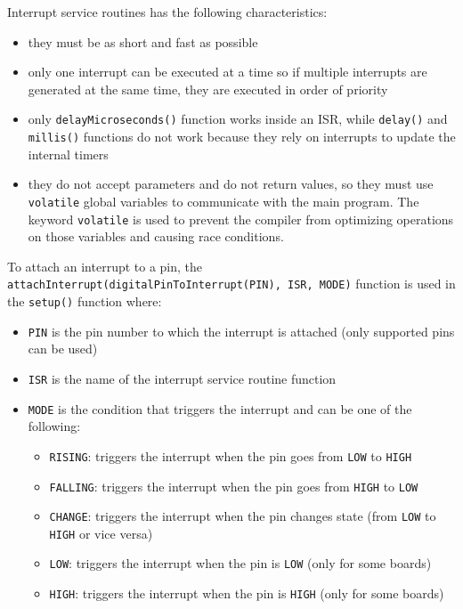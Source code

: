 \noindent
Interrupt service routines has the following characteristics:
\begin{itemize}
	\item they must be as short and fast as possible
	\item only one interrupt can be executed at a time so if multiple interrupts are generated at the same time, they are
	executed in order of priority
	\item only \texttt{delayMicroseconds()} function works inside an ISR, while \texttt{delay()} and \texttt{millis()}
	functions do not work because they rely on interrupts to update the internal timers
	\item they do not accept parameters and do not return values, so they must use \texttt{volatile} global variables to
	communicate with the main program. The keyword \texttt{volatile} is used to prevent the compiler from optimizing operations
	on those variables and causing race conditions.
\end{itemize}

\noindent
To attach an interrupt to a pin, the \texttt{attachInterrupt(digitalPinToInterrupt(PIN), ISR, MODE)} function is used in the
\texttt{setup()} function where:
\begin{itemize}
	\item \texttt{PIN} is the pin number to which the interrupt is attached (only supported pins can be used)
	\item \texttt{ISR} is the name of the interrupt service routine function
	\item \texttt{MODE} is the condition that triggers the interrupt and can be one of the following:
	\begin{itemize}[topsep=-1pt]
		\item \texttt{RISING}: triggers the interrupt when the pin goes from \texttt{LOW} to \texttt{HIGH}
		\item \texttt{FALLING}: triggers the interrupt when the pin goes from \texttt{HIGH} to \texttt{LOW}
		\item \texttt{CHANGE}: triggers the interrupt when the pin changes state (from \texttt{LOW} to \texttt{HIGH} or vice versa)
		\item \texttt{LOW}: triggers the interrupt when the pin is \texttt{LOW} (only for some boards)
		\item \texttt{HIGH}: triggers the interrupt when the pin is \texttt{HIGH} (only for some boards)
	\end{itemize}
\end{itemize}

